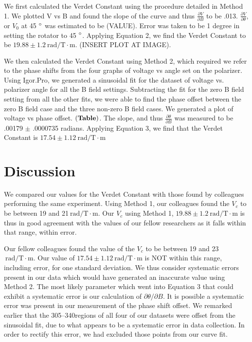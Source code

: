 \documentclass[prb,preprint]{revtex4-1}
\begin{document}
{{{We first calculated the Verdet Constant using the procedure detailed in Method 1.    We plotted V vs B and found the slope of the curve and thus $\frac{\partial V}{\partial B}$ to be .013.  $\frac{\partial V}{\partial \theta}$, or $V_{0}$ at 45 $\degree$ was estimated to be (VALUE).  Error was taken to be 1 degree in setting the rotator to 45 $\degree$.  Applying Equation 2, we find the Verdet Constant to be $19.88 \pm 1.2 \mathrm{~rad/T} \cdot \textrm{m}$. (INSERT PLOT AT IMAGE).
{We then calculated the Verdet Constant using Method 2, which required we refer to the phase shifts from the four graphs of voltage vs angle set on the polarizer.  Using Igor.Pro, we generated a sinusoidal fit for the dataset of voltage vs. polarizer angle for all the B field settings.  Subtracting the fit for the zero B field setting from all the other fits, we were able to find the phase offset between the zero B field case and the three non-zero B field cases.  We generated a plot of voltage vs phase offset.  $\bf (Table)$.    The slope, and thus $\frac{\partial \theta}{\partial B}$ was measured to be .00179 $\pm$ .0000735 radians.  Applying Equation 3, we find that the Verdet Constant is $17.54 \pm 1.12 \mathrm{~rad/T} \cdot \textrm{m}$


\section{Discussion}

{We compared our values for the Verdet Constant with those found by colleagues performing the same experiment.  Using Method 1, our colleagues found the $V_{c}$ to be between 19 and 21$\mathrm{~rad/T} \cdot \textrm{m}$.  Our $V_{c}$ using Method 1, $19.88 \pm 1.2 \mathrm{~rad/T} \cdot \textrm{m}$ is thus in good agreement with the values of our fellow researchers as it falls within that range, within error.

{Our fellow colleagues found the value of the $V_{c}$ to be between 19 and 23 $\mathrm{~rad/T} \cdot \textrm{m}$.  Our value of $17.54 \pm 1.12 \mathrm{~rad/T} \cdot \textrm{m}$ is NOT within this range, including error, for one standard deviation.  We thus consider systematic errors present in our data which would have generated an inaccurate value using Method 2.  The most likely parameter which went into Equation 3 that could exhibit a systematic error is our calculation of $\partial \theta/\partial B$.  It is possible a systematic error was present in our measurement of the phase shift offset.  We remarked earlier that the 305\degree--340\degree regions of all four of our datasets were offset from the sinusoidal fit, due to what appears to be a systematic error in data collection.  In order to rectify this error, we had excluded those points from our curve fit. 

}}}}}}
\end{document}
